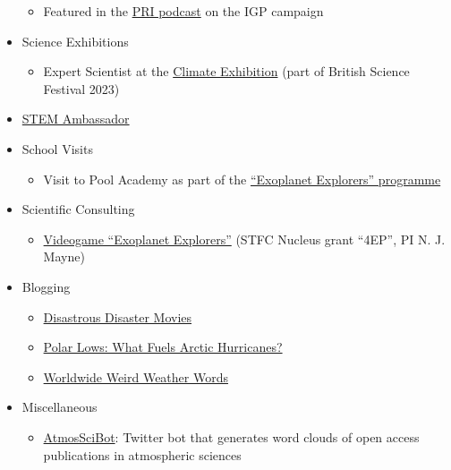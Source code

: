 \documentclass[a4paper, 11pt]{article}
\begin{document}
\begin{itemize}[nosep, leftmargin=10pt]
\begin{itemize}
        \item Featured in the \href{https://theworld.org/stories/2018-08-03/sea-and-sky-scientists-brave-wicked-weather-explore-key-ocean-current}{PRI podcast} on the IGP campaign
    \end{itemize}
    \item Science Exhibitions
    \begin{itemize}
        \item Expert Scientist at the \href{https://exetersciencecentre.org/exhibition-2023}{Climate Exhibition} (part of British Science Festival 2023)
    \end{itemize}
    \item \href{https://www.stem.org.uk/stem-ambassadors}{STEM Ambassador}
    \item School Visits
    \begin{itemize}
        \item Visit to Pool Academy as part of the \href{https://physics-astronomy.exeter.ac.uk/exoplanetexplorers/}{``Exoplanet Explorers'' programme}
    \end{itemize}
    \item Scientific Consulting
    \begin{itemize}
        \item \href{https://www.wethecurious.org/curious-stuff/stargazing-night-sky/exoplanet-explorers}{Videogame ``Exoplanet Explorers''} (STFC Nucleus grant ``4EP'', PI N. J. Mayne)
    \end{itemize}
    \item Blogging
    \begin{itemize}
        \item \href{http://www.scisnack.com/2015/12/17/disastrous-disaster-movies}{Disastrous Disaster Movies}
        \item \href{http://www.scisnack.com/2015/03/04/polar-lows-what-fuels-arctic-hurricanes}{Polar Lows: What Fuels Arctic Hurricanes?}
        \item \href{http://www.scisnack.com/2014/12/17/worldwide-weird-weather-words}{Worldwide Weird Weather Words}
    \end{itemize}
    \item Miscellaneous
    \begin{itemize}
        \item \href{https://twitter.com/atmosscibot}{AtmosSciBot}: Twitter bot that generates word clouds of open access publications in atmospheric sciences
    \end{itemize}
\end{itemize}
\end{document}
